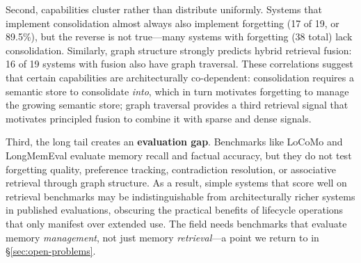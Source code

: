 Second, capabilities cluster rather than distribute uniformly. Systems that
implement consolidation almost always also implement forgetting (17 of 19, or
89.5\%), but the reverse is not true---many systems with forgetting (38 total)
lack consolidation. Similarly, graph structure strongly predicts hybrid
retrieval fusion: 16 of 19 systems with fusion also have graph traversal.
These correlations suggest that certain capabilities are architecturally
co-dependent: consolidation requires a semantic store to consolidate
\emph{into}, which in turn motivates forgetting to manage the growing semantic
store; graph traversal provides a third retrieval signal that motivates
principled fusion to combine it with sparse and dense signals.

Third, the long tail creates an \textbf{evaluation gap}. Benchmarks like
LoCoMo and LongMemEval evaluate memory recall and factual accuracy, but they
do not test forgetting quality, preference tracking, contradiction resolution,
or associative retrieval through graph structure. As a result, simple systems
that score well on retrieval benchmarks may be indistinguishable from
architecturally richer systems in published evaluations, obscuring the
practical benefits of lifecycle operations that only manifest over extended
use. The field needs benchmarks that evaluate memory \emph{management}, not
just memory \emph{retrieval}---a point we return to in
\S\ref{sec:open-problems}.


